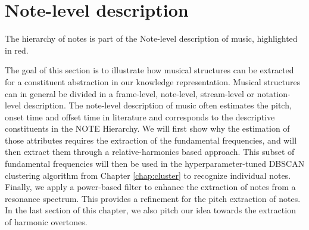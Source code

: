 \chapter{Note-level description}
\label{chap:notelevel}
\begin{marginfigure}
\centering
\vspace{7cm}

\vspace{0.1cm}
\caption{The hierarchy of notes is part of
the Note-level description of music, highlighted in red.}
\label{noteExtraction} 
\end{marginfigure}
The goal of this section is to illustrate how musical structures can be extracted for a constituent abstraction in our knowledge representation.
Musical structures can in general be divided in a frame-level, note-level, stream-level or notation-level description.
The note-level description of music often estimates the pitch, onset time and offset time in literature and corresponds to the descriptive constituents in the NOTE Hierarchy. We will first show why the estimation of those attributes requires the extraction of the fundamental frequencies, and will then extract them through a relative-harmonics based approach. This subset of fundamental frequencies will then be used in the hyperparameter-tuned DBSCAN clustering algorithm from Chapter \ref{chap:cluster} to recognize individual notes. Finally, we apply a power-based filter to enhance the extraction of notes from a resonance spectrum. This provides a refinement for the pitch extraction of notes. In the last section of this chapter, we also pitch our idea towards the extraction of harmonic overtones.


